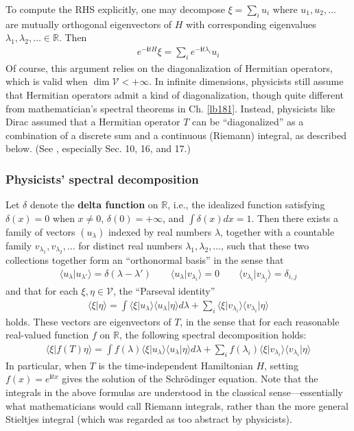 \documentclass[12pt,b5paper,notitlepage]{article}
\theoremstyle{definition}
\theoremstyle{plain}
\newcommand{\bk}[1]{\langle {#1}\rangle}
\newcommand{\im}{\mathbf{i}}
\newcommand{\Rbb}{\mathbb R}
\newcommand{\MV}{\mathcal V}
\numberwithin{equation}{section}
\begin{document}
To compute the RHS explicitly, one may decompose $\xi=\sum_i u_i$ where $u_1,u_2,\dots$ are mutually orthogonal eigenvectors of $H$ with corresponding eigenvalues $\lambda_1,\lambda_2,\dots\in\Rbb$. Then
\begin{align*}
e^{-\im tH}\xi=\sum_i e^{-\im t\lambda_i}u_i
\end{align*}
Of course, this argument relies on the diagonalization of Hermitian operators, which is valid when $\dim \MV<+\infty$. In infinite dimensions, physicists still assume that Hermitian operators admit a kind of diagonalization, though quite different from mathematician's spectral theorems in Ch. \ref{lb181}. Instead, physicists like Dirac assumed that a Hermitian operator $T$ can be ``diagonalized'' as a combination of a discrete sum and a continuous (Riemann) integral, as described below. (See \cite{Dir30}, especially Sec. 10, 16, and 17.)


\subsubsection{Physicists' spectral decomposition}


Let $\delta$ denote the \textbf{delta function} on $\Rbb$, i.e., the idealized function satisfying $\delta(x)=0$ when $x\neq0$, $\delta(0)=+\infty$, and $\int\delta(x)dx=1$. Then there exists a family of vectors $(u_\lambda)$ indexed by real numbers $\lambda$, together with a countable family $v_{\lambda_1},v_{\lambda_2},\dots$ for distinct real numbers $\lambda_1,\lambda_2,\dots$, such that these two collections together form an ``orthonormal basis'' in the sense that
\begin{align}\label{eq187}
\bk{u_{\lambda}|u_{\lambda'}}=\delta(\lambda-\lambda')\qquad \bk{u_{\lambda}|v_{\lambda_i}}=0\qquad \bk{v_{\lambda_i}|v_{\lambda_j}}=\delta_{i,j}
\end{align}
and that for each $\xi,\eta\in \MV$, the ``Parseval identity''
\begin{align*}
\bk{\xi|\eta}=\int \bk{\xi|u_\lambda}\bk{u_\lambda|\eta}d\lambda+\sum_i\bk{\xi|v_{\lambda_i}}\bk{v_{\lambda_i}|\eta}
\end{align*}
holds. These vectors are eigenvectors of $T$, in the sense that for each reasonable real-valued function $f$ on $\Rbb$, the following spectral decomposition holds:
\begin{align*}
\bk{\xi|f(T)\eta}=\int f(\lambda)\bk{\xi|u_\lambda}\bk{u_\lambda|\eta}d\lambda+\sum_if(\lambda_i)\bk{\xi|v_{\lambda_i}}\bk{v_{\lambda_i}|\eta}
\end{align*}
In particular, when $T$ is the time-independent Hamiltonian $H$, setting $f(x)=e^{\im tx}$ gives the solution of the Schr\"odinger equation. Note that the integrals in the above formulas are understood in the classical sense—essentially what mathematicians would call Riemann integrals, rather than the more general Stieltjes integral (which was regarded as too abstract by physicists).
\end{document}

